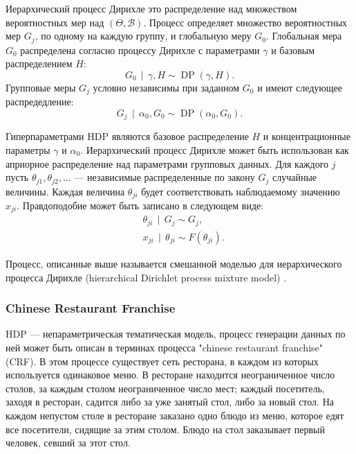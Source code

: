 \documentclass[12pt, a4paper]{article}
\newcommand\todo[1]{\marginpar{\textcolor{red}{#1}}}
\DeclareMathOperator{\DP}{DP}
\DeclareMathOperator{\svert}{\,\vert\,}
\begin{document}
  Иерархический процесс Дирихле это распределение над множеством вероятностных мер над $(\Theta, \mathcal{B})$. Процесс определяет множество вероятностных мер $G_j$, по одному на каждую группу, и глобальную меру $G_0$. Глобальная мера $G_0$ распределена согласно процессу Дирихле с параметрами $\gamma$ и базовым распределением $H$:
  \begin{equation}
  G_0 \svert \gamma, H \sim \DP(\gamma, H).
  \end{equation}
  Групповые меры $G_j$ условно независимы при заданном $G_0$ и имеют следующее распредедление:
  \begin{equation}
  G_j \svert \alpha_0, G_0 \sim \DP(\alpha_0, G_0).
  \end{equation}
  
  Гиперпараметрами HDP являются базовое распределение $H$ и концентрационные параметры $\gamma$ и $\alpha_0$.
  Иерархический процесс Дирихле может быть использован как априорное распределение над параметрами групповых данных. Для каждого $j$ пусть $\theta_{j1}, \theta_{j2}, \ldots$ --- независимые распределенные по закону $G_j$ случайные величины. Каждая величина $\theta_{ji}$ будет соответствовать наблюдаемому значению $x_{ji}$. Правдоподобие может быть записано в следующем виде:
  \begin{equation}
  \begin{aligned}
  & \theta_{ji} \svert G_j \sim G_j, \\
  & x_{ji} \svert \theta_{ji} \sim F(\theta_{ji}).
  \end{aligned}
  \end{equation}
  
  Процесс, описанные выше называется смешанной моделью для иерархического процесса Дирихле (hierarchical Dirichlet process mixture model) \cite{hdp-1}.
  
  \subsubsection{Chinese Restaurant Franchise}

  
  HDP --- непараметрическая тематическая модель, процесс генерации данных по ней может быть описан в терминах процесса "chinese restaurant franchise" (CRF). В этом процессе существует сеть ресторана, в каждом из которых используется одинаковое меню. В ресторане находится неограниченное число столов, за каждым столом неограниченное число мест; каждый посетитель, заходя в ресторан, садится либо за уже занятый стол, либо за новый стол. На каждом непустом столе в ресторане заказано одно блюдо из меню, которое едят все посетители, сидящие за этим столом. Блюдо на стол заказывает первый человек, севший за этот стол.
  
\end{document}
